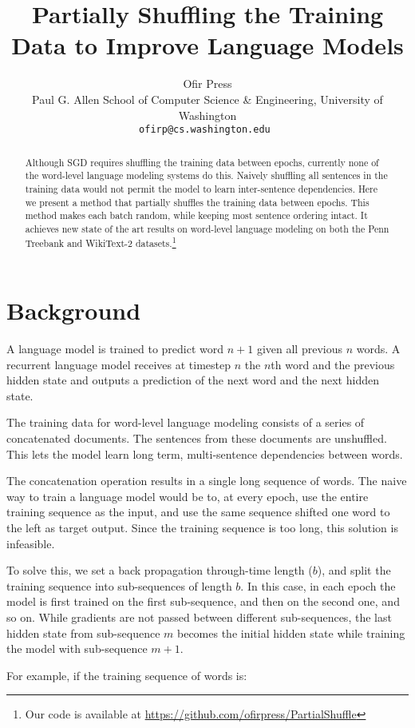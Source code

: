 \documentclass[11pt,a4paper]{article}
\title{Partially Shuffling the Training Data to Improve Language Models}
\author{
	Ofir Press \\
	Paul G. Allen School of Computer Science \& Engineering,
	University of Washington \\
	{\tt ofirp@cs.washington.edu }
}
\date{}
\begin{document}
\maketitle
\begin{abstract}
Although SGD requires shuffling the training data between epochs, currently none of the word-level language modeling systems do this. Naively shuffling all sentences in the training data would not permit the model to learn inter-sentence dependencies. Here we present a method that partially shuffles the training data between epochs. This method makes each batch random, while keeping most sentence ordering intact. It achieves new state of the art results on word-level language modeling on both the Penn Treebank and WikiText-2 datasets.\footnote{Our code is available at {\tiny \url{https://github.com/ofirpress/PartialShuffle}}}
\end{abstract}

\section{Background}
A language model is trained to predict word $n+1$ given all previous $n$ words. A recurrent language model receives at timestep $n$ the $n$th word and the previous hidden state and outputs a prediction of the next word and the next hidden state. 

The training data for word-level language modeling consists of a series of concatenated documents. The sentences from these documents are unshuffled. This lets the model learn long term, multi-sentence dependencies between words. 

The concatenation operation results in a single long sequence of words. 
The naive way to train a language model would be to, at every epoch, use the entire training sequence as the input, and use the same sequence shifted one word to the left as target output.
Since the training sequence is too long, this solution is infeasible.

To solve this, we set a back propagation through-time length ($b$), and split the training sequence into sub-sequences of length $b$. In this case, in each epoch the model is first trained on the first sub-sequence, and then on the second one, and so on. While gradients are not passed between different sub-sequences, the last hidden state from sub-sequence $m$ becomes the initial hidden state while training the model with sub-sequence $m+1$. 

For example, if the training sequence of words is:
\end{document}
